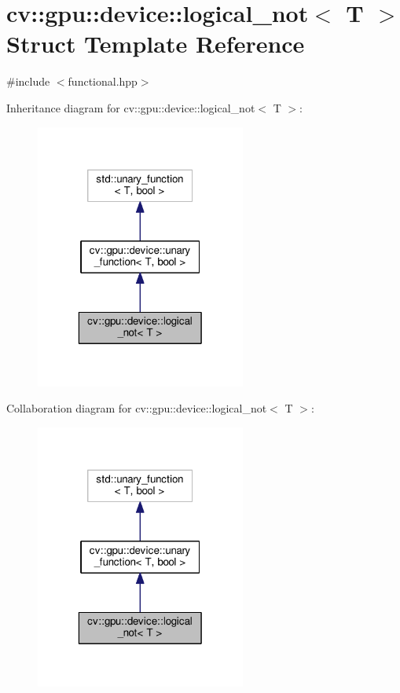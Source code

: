 \hypertarget{structcv_1_1gpu_1_1device_1_1logical__not}{\section{cv\-:\-:gpu\-:\-:device\-:\-:logical\-\_\-not$<$ T $>$ Struct Template Reference}
\label{structcv_1_1gpu_1_1device_1_1logical__not}
}


{\ttfamily \#include $<$functional.\-hpp$>$}



Inheritance diagram for cv\-:\-:gpu\-:\-:device\-:\-:logical\-\_\-not$<$ T $>$\-:\nopagebreak
\begin{figure}[H]
\begin{center}
\leavevmode
\includegraphics[width=196pt]{structcv_1_1gpu_1_1device_1_1logical__not__inherit__graph}
\end{center}
\end{figure}


Collaboration diagram for cv\-:\-:gpu\-:\-:device\-:\-:logical\-\_\-not$<$ T $>$\-:\nopagebreak
\begin{figure}[H]
\begin{center}
\leavevmode
\includegraphics[width=196pt]{structcv_1_1gpu_1_1device_1_1logical__not__coll__graph}
\end{center}
\end{figure}
